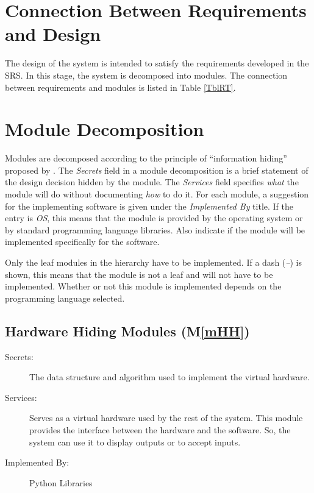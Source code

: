 \documentclass[12pt, titlepage]{article}
\newcommand{\mref}[1]{M\ref{#1}}
\begin{document}
\section{Connection Between Requirements and Design} \label{SecConnection}

The design of the system is intended to satisfy the requirements developed in
the SRS. In this stage, the system is decomposed into modules. The connection
between requirements and modules is listed in Table \ref{TblRT}.

\section{Module Decomposition} \label{SecMD}

Modules are decomposed according to the principle of ``information hiding''
proposed by \citet{ParnasEtAl1984}. The \emph{Secrets} field in a module
decomposition is a brief statement of the design decision hidden by the
module. The \emph{Services} field specifies \emph{what} the module will do
without documenting \emph{how} to do it. For each module, a suggestion for the
implementing software is given under the \emph{Implemented By} title. If the
entry is \emph{OS}, this means that the module is provided by the operating
system or by standard programming language libraries.  Also indicate if the
module will be implemented specifically for the software.

Only the leaf modules in the
hierarchy have to be implemented. If a dash (\emph{--}) is shown, this means
that the module is not a leaf and will not have to be implemented. Whether or
not this module is implemented depends on the programming language
selected.

\subsection{Hardware Hiding Modules (\mref{mHH})}

\begin{description}
\item[Secrets:]The data structure and algorithm used to implement the virtual
  hardware.
\item[Services:]Serves as a virtual hardware used by the rest of the
  system. This module provides the interface between the hardware and the
  software. So, the system can use it to display outputs or to accept inputs.
\item[Implemented By:] Python Libraries
\end{description}
\end{document}
